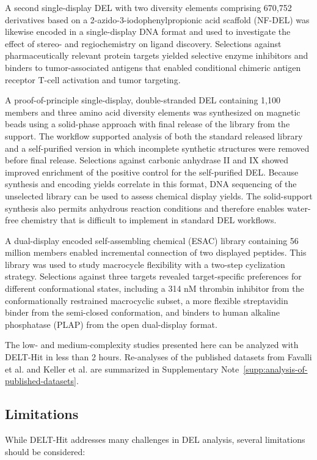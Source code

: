 \documentclass[pdflatex,sn-nature]{sn-jnl}
\begin{document}
A second single-display DEL with two diversity elements comprising 670,752 derivatives based on a 2-azido-3-iodophenylpropionic acid scaffold (NF-DEL) was likewise encoded in a single-display DNA format and used to investigate the effect of stereo- and regiochemistry on ligand discovery. Selections against pharmaceutically relevant protein targets yielded selective enzyme inhibitors and binders to tumor-associated antigens that enabled conditional chimeric antigen receptor T-cell activation and tumor targeting\cite{favalli_stereoregiodefineddnaencoded_2021}.

A proof-of-principle single-display, double-stranded DEL containing 1,100 members and three amino acid diversity elements was synthesized on magnetic beads using a solid-phase approach with final release of the library from the support. The workflow supported analysis of both the standard released library and a self-purified version in which incomplete synthetic structures were removed before final release. Selections against carbonic anhydrase II and IX showed improved enrichment of the positive control for the self-purified DEL. Because synthesis and encoding yields correlate in this format, DNA sequencing of the unselected library can be used to assess chemical display yields. The solid-support synthesis also permits anhydrous reaction conditions and therefore enables water-free chemistry that is difficult to implement in standard DEL workflows\cite{keller_highlypurednaencoded_2024}.

A dual-display encoded self-assembling chemical (ESAC) library containing 56 million members enabled incremental connection of two displayed peptides. This library was used to study macrocycle flexibility with a two-step cyclization strategy. Selections against three targets revealed target-specific preferences for different conformational states, including a 314 nM thrombin inhibitor from the conformationally restrained macrocyclic subset, a more flexible streptavidin binder from the semi-closed conformation, and binders to human alkaline phosphatase (PLAP) from the open dual-display format\cite{petrov_flexibilitytuningdualdisplaydnaencoded_2025}.

The low- and medium-complexity studies presented here can be analyzed with DELT-Hit in less than 2 hours. Re-analyses of the published datasets from Favalli et al. and Keller et al. are summarized in Supplementary Note~\ref{supp:analysis-of-published-datasets}.

\subsection{Limitations}
While DELT-Hit addresses many challenges in DEL analysis, several limitations should be considered:
\end{document}
